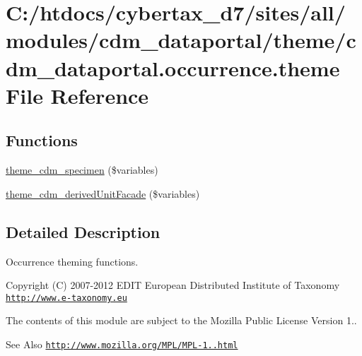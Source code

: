 \hypertarget{cdm__dataportal_8occurrence_8theme}{\section{C\-:/htdocs/cybertax\-\_\-d7/sites/all/modules/cdm\-\_\-dataportal/theme/cdm\-\_\-dataportal.occurrence.\-theme File Reference}
\label{cdm__dataportal_8occurrence_8theme}
}
\subsection*{Functions}
\begin{DoxyCompactItemize}
\item 
\hyperlink{cdm__dataportal_8occurrence_8theme_a91e6186d8e9b2365ac3a2936e059e9b7}{theme\-\_\-cdm\-\_\-specimen} (\$variables)
\item 
\hyperlink{cdm__dataportal_8occurrence_8theme_acd8fabd475fd76e4f17e6cddde481dd5}{theme\-\_\-cdm\-\_\-derived\-Unit\-Facade} (\$variables)
\end{DoxyCompactItemize}


\subsection{Detailed Description}
Occurrence theming functions.

\begin{DoxyCopyright}{Copyright}
(C) 2007-\/2012 E\-D\-I\-T European Distributed Institute of Taxonomy \href{http://www.e-taxonomy.eu}{\tt http\-://www.\-e-\/taxonomy.\-eu}
\end{DoxyCopyright}
The contents of this module are subject to the Mozilla Public License Version 1.. \begin{DoxySeeAlso}{See Also}
\href{http://www.mozilla.org/MPL/MPL-1.1.html}{\tt http\-://www.\-mozilla.\-org/\-M\-P\-L/\-M\-P\-L-\/1..\-html} 
\end{DoxySeeAlso}


